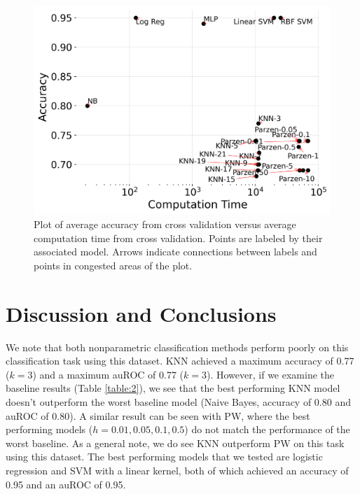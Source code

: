 \documentclass[12pt]{article}
\begin{document}
    \begin{figure}[htbp]
        \centerline{\includegraphics[scale=1]{../results/accuracy_vs_computation.png}}
        \caption{Plot of average accuracy from cross validation versus average computation time from cross validation. Points are labeled by their associated model. Arrows indicate connections between labels and points in congested areas of the plot.}
        \label{fig:2}
    \end{figure}
	
	\section{Discussion and Conclusions}
	
	We note that both nonparametric classification methods perform poorly on this classification task using this dataset. KNN achieved a maximum accuracy of 0.77 ($k = 3$) and a maximum auROC of 0.77 ($k=3$). However, if we examine the baseline results (Table \ref{table:2}), we see that the best performing KNN model doesn't outperform the worst baseline model (Naive Bayes, accuracy of 0.80 and auROC of 0.80). A similar result can be seen with PW, where the best performing models ($h = 0.01, 0.05, 0.1, 0.5$) do not match the performance of the worst baseline. As a general note, we do see KNN outperform PW on this task using this dataset. The best performing models that we tested are logistic regression and SVM with a linear kernel, both of which achieved an accuracy of 0.95 and an auROC of 0.95.
	
\end{document}
